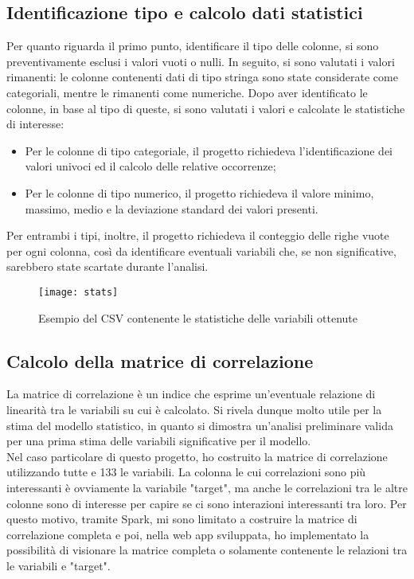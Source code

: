 \subsection{Identificazione tipo e calcolo dati statistici}
Per quanto riguarda il primo punto, identificare il tipo delle colonne, si sono preventivamente esclusi i valori vuoti o nulli.
In seguito, si sono valutati i valori rimanenti: le colonne contenenti dati di tipo stringa sono state considerate come categoriali, mentre le rimanenti come numeriche. 
Dopo aver identificato le colonne, in base al tipo di queste, si sono valutati i valori e calcolate le statistiche di interesse:
\begin{itemize}
	\item Per le colonne di tipo categoriale, il progetto richiedeva l'identificazione dei valori univoci ed il calcolo delle relative occorrenze;
	\item Per le colonne di tipo numerico, il progetto richiedeva il valore minimo, massimo, medio e la deviazione standard dei valori presenti.
\end{itemize}
Per entrambi i tipi, inoltre, il progetto richiedeva il conteggio delle righe vuote per ogni colonna, così da identificare eventuali variabili che, se non significative, sarebbero state scartate durante l'analisi.
\clearpage
\begin{figure}[!h]
	\centering
	\texttt{[image: stats]}
	\caption{Esempio del CSV contenente le statistiche delle variabili ottenute}
\end{figure}

\subsection{Calcolo della matrice di correlazione}
La matrice di correlazione è un indice che esprime un'eventuale relazione di linearità tra le variabili su cui è calcolato. Si rivela dunque molto utile per la stima del modello statistico, in quanto si dimostra un'analisi preliminare valida per una prima stima delle variabili significative per il modello.\\
Nel caso particolare di questo progetto, ho costruito la matrice di correlazione utilizzando tutte e 133 le variabili. La colonna le cui correlazioni sono più interessanti è ovviamente la variabile "target", ma anche le correlazioni tra le altre colonne sono di interesse per capire se ci sono interazioni interessanti tra loro. Per questo motivo, tramite Spark, mi sono limitato a costruire la matrice di correlazione completa e poi, nella \gls{web app} sviluppata, ho implementato la possibilità di visionare la matrice completa o solamente contenente le relazioni tra le variabili e "target".


